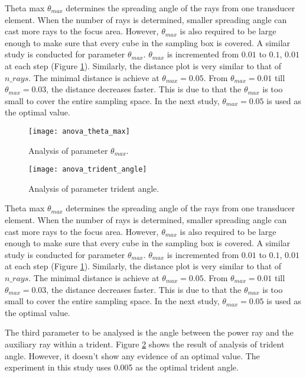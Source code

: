 Theta max $\theta_{max}$ determines the spreading angle of the rays from one transducer element. When the number of rays is determined, smaller spreading angle can cast more rays to the focus area. However, $\theta_{max}$ is also required to be large enough to make sure that every cube in the sampling box is covered. A similar study is conducted for parameter $\theta_{max}$. $\theta_{max}$ is incremented from $0.01$ to $0.1$, $0.01$ at each step (Figure \ref{fig:anova_theta_max}). Similarly, the distance plot is very similar to that of $n\_rays$. The minimal distance is achieve at $\theta_{max}=0.05$. From $\theta_{max}=0.01$ till $\theta_{max}=0.03$, the distance decreases faster. This is due to that the $\theta_{max}$ is too small to cover the entire sampling space. In the next study, $\theta_{max}=0.05$ is used as the optimal value.

\begin{figure}[h]
    \centering
    \texttt{[image: anova\_theta\_max]}
    \caption{Analysis of parameter $\theta_{max}$.}
    \label{fig:anova_theta_max}
\end{figure}

\begin{figure}[h]
    \centering
    \texttt{[image: anova\_trident\_angle]}
    \caption{Analysis of parameter trident angle.}
    \label{fig:anova_trident_angle}
\end{figure}

Theta max $\theta_{max}$ determines the spreading angle of the rays from one transducer element. When the number of rays is determined, smaller spreading angle can cast more rays to the focus area. However, $\theta_{max}$ is also required to be large enough to make sure that every cube in the sampling box is covered. A similar study is conducted for parameter $\theta_{max}$. $\theta_{max}$ is incremented from $0.01$ to $0.1$, $0.01$ at each step (Figure \ref{fig:anova_theta_max}). Similarly, the distance plot is very similar to that of $n\_rays$. The minimal distance is achieve at $\theta_{max}=0.05$. From $\theta_{max}=0.01$ till $\theta_{max}=0.03$, the distance decreases faster. This is due to that the $\theta_{max}$ is too small to cover the entire sampling space. In the next study, $\theta_{max}=0.05$ is used as the optimal value.

The third parameter to be analysed is the angle between the power ray and the auxiliary ray within a trident. Figure \ref{fig:anova_trident_angle} shows the result of analysis of trident angle. However, it doesn't show any evidence of an optimal value. The experiment in this study uses 0.005 as the optimal trident angle.
